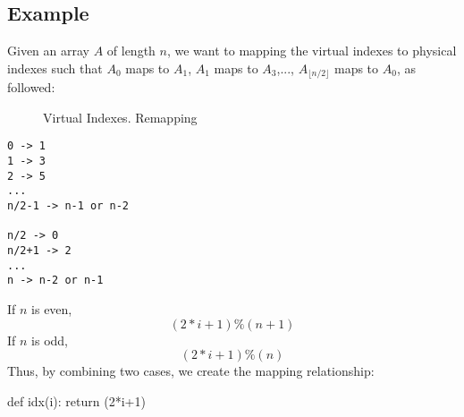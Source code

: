 \subsection{Example}
 Given an array $A$ of length $n$, we want to mapping the virtual indexes to physical indexes such that $A_0$ maps to $A_1$, $A_1$ maps to $A_3$,..., $A_{\lfloor n/2\rfloor}$ maps to $A_0$, as followed: 
\begin{figure}[hbtp]
\centering
{}
\caption{Virtual Indexes. Remapping}
\label{fig:virtual_indexes}
\end{figure}
\begin{lstlisting}
0 -> 1
1 -> 3
2 -> 5
...
n/2-1 -> n-1 or n-2

n/2 -> 0
n/2+1 -> 2
...
n -> n-2 or n-1
\end{lstlisting}
If $n$ is even, 
$$
(2*i+1)\%(n+1)
$$
If $n$ is odd,
$$
(2*i+1)\%(n)
$$
Thus, by combining two cases, we create the mapping relationship: 
\begin{python}
def idx(i):
    return (2*i+1) %
\end{python}

